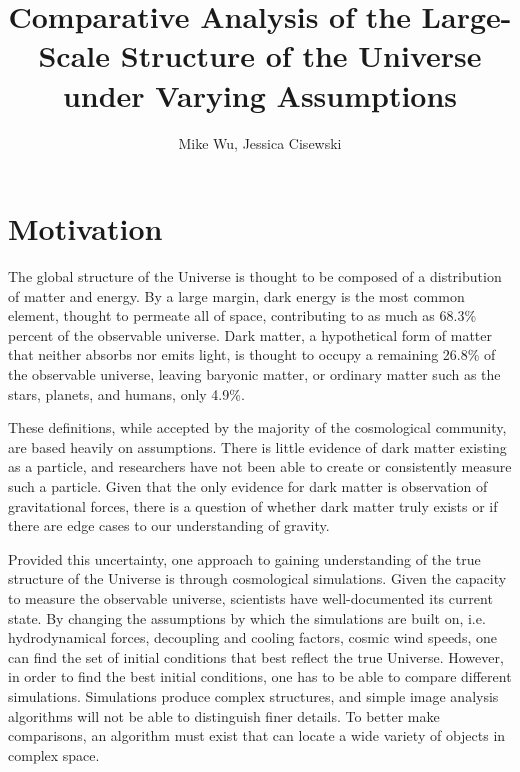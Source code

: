 \documentclass[12pt]{article}
\begin{document}
\title{Comparative Analysis of the Large-Scale Structure of the Universe under Varying Assumptions}
\author{Mike Wu, Jessica Cisewski}

\maketitle
\section{Motivation}
The global structure of the Universe is thought to be composed of a distribution of matter and energy. By a large margin, dark energy is the most common element, thought to permeate all of space, contributing to as much as 68.3\% percent of the observable universe. Dark matter, a hypothetical form of matter that neither absorbs nor emits light, is thought to occupy a remaining 26.8\% of the observable universe, leaving baryonic matter, or ordinary matter such as the stars, planets, and humans, only 4.9\%. 

These definitions, while accepted by the majority of the cosmological community, are based heavily on assumptions. There is little evidence of dark matter existing as a particle, and researchers have not been able to create or consistently measure such a particle. Given that the only evidence for dark matter is observation of gravitational forces, there is a question of whether dark matter truly exists or if there are edge cases to our understanding of gravity.

Provided this uncertainty, one approach to gaining understanding of the true structure of the Universe is through cosmological simulations. Given the capacity to measure the observable universe, scientists have well-documented its current state. By changing the assumptions by which the simulations are built on, i.e. hydrodynamical forces, decoupling and cooling factors, cosmic wind speeds, one can find the set of initial conditions that best reflect the true Universe. However, in order to find the best initial conditions, one has to be able to compare different simulations. Simulations produce complex structures, and simple image analysis algorithms will not be able to distinguish finer details. To better make comparisons, an algorithm must exist that can locate a wide variety of objects in complex space.
\end{document}
